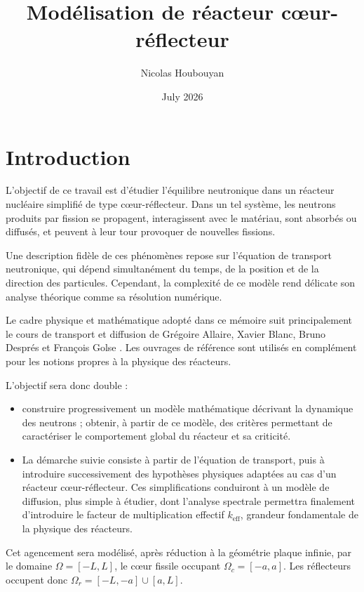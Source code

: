 \documentclass{article}
\title{Modélisation de réacteur cœur-réflecteur}
\author{Nicolas Houbouyan}
\date{July 2026}
\newcommand{\keff}{k_{\mathrm{eff}}}
\begin{document}
\maketitle

\tableofcontents
\newpage

\section*{Introduction}
L'objectif de ce travail est d'étudier l'équilibre neutronique dans un réacteur nucléaire simplifié de type cœur-réflecteur. Dans un tel système, les neutrons produits par fission se propagent, interagissent avec le matériau, sont absorbés ou diffusés, et peuvent à leur tour provoquer de nouvelles fissions.

Une description fidèle de ces phénomènes repose sur l'équation de transport neutronique, qui dépend simultanément du temps, de la position et de la direction des particules. Cependant, la complexité de ce modèle rend délicate son analyse théorique comme sa résolution numérique.

Le cadre physique et mathématique adopté dans ce mémoire suit principalement le cours de transport et diffusion de Grégoire Allaire, Xavier Blanc, Bruno Després et François Golse \cite{Allaire2018}. Les ouvrages de référence \cite{Duderstadt1976,Stacey2018} sont utilisés en complément pour les notions propres à la physique des réacteurs.

L'objectif sera donc double :
\begin{itemize}
    \item construire progressivement un modèle mathématique décrivant la dynamique des neutrons ;
obtenir, à partir de ce modèle, des critères permettant de caractériser le comportement global du réacteur et sa criticité.

    \item La démarche suivie consiste à partir de l'équation de transport, puis à introduire successivement des hypothèses physiques adaptées au cas d'un réacteur cœur-réflecteur. Ces simplifications conduiront à un modèle de diffusion, plus simple à étudier, dont l'analyse spectrale permettra finalement d'introduire le facteur de multiplication effectif $\keff$, grandeur fondamentale de la physique des réacteurs.

\end{itemize}

Cet agencement sera modélisé, après réduction à la géométrie plaque infinie, par le domaine $\Omega = [-L,L]$, le cœur fissile occupant $\Omega_c = [-a,a]$. Les réflecteurs occupent donc $\Omega_r = [-L,-a]\cup [a,L]$. \\
\end{document}
